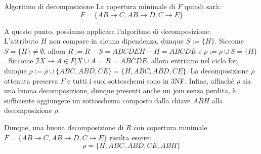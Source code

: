 \begin{Example}{Algoritmo di decomposizione}{}
    La copertura minimale di $F$ quindi sarà:
    \begin{equation*}
        F = \{AB\to C, AB\to D, C\to E\}
    \end{equation*}

    A questo punto, possiamo applicare l'algoritmo di decomposizione:\\
    L'attributo $H$ non compare in alcuna dipendenza, dunque $S := \{H\}$. Siccome $S = \{H\}\neq\emptyset$, allora $R := R - S = ABCDEH - H = ABCDE$ e $\rho := \rho \cup S = \{H\}$. Siccome $\nexists X\to A \in F | X \cup A = R = ABCDE$, allora entriamo nel ciclo for, dunque $\rho := \rho \cup \{ABC, ABD, CE\} = \{H, ABC, ABD, CE\}$. La decomposizione $\rho$ ottenuta preserva $F$ e tutti i suoi sottoschemi sono in 3NF. Infine, affinché $\rho$ sia una buona decomposizione, dunque presenti anche un join senza perdita, è sufficiente aggiungere un sottoschema composto dalla chiave $ABH$ alla decomposizione $\rho$.
    
    Dunque, una buona decomposizione di $R$ con copertura minimale $F = \{AB\to C, AB\to D, C\to E\}$ risulta essere:
    \begin{equation*}
        \rho = \{H, ABC, ABD, CE, ABH\}
    \end{equation*}
\end{Example}